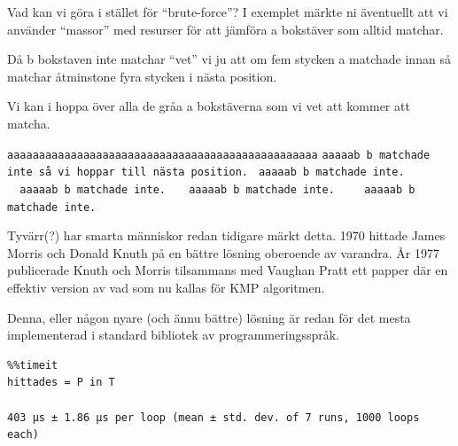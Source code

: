 \documentclass[11pt, aspectratio=169, table]{beamer}
\begin{document}
\begin{frame}{Vad kan vi göra i stället för ``brute-force''?}
\vspace{-0.5cm}
I exemplet märkte ni äventuellt att vi använder ``massor'' med resurser för att jämföra a bokstäver som alltid matchar.

Då b bokstaven inte matchar ``vet'' vi ju att om fem stycken a matchade innan så matchar åtminstone fyra stycken i nästa position.

Vi kan i hoppa över alla de gråa a bokstäverna som vi vet att kommer att matcha.

\texttt{aaaaaaaaaaaaaaaaaaaaaaaaaaaaaaaaaaaaaaaaaaaaaaaaa}\linebreak
{\color{green}\texttt{aaaaa}}{\color{red}\texttt{b}}{\color{gray}\texttt{~b matchade inte så vi hoppar till nästa position.}}\linebreak
{\color{gray}\texttt{~aaaa}}{\color{green}\texttt{a}}{\color{red}\texttt{b}}{\color{gray}\texttt{~b matchade inte.}}\linebreak
{\color{gray}\texttt{~~aaaa}}{\color{green}\texttt{a}}{\color{red}\texttt{b}}{\color{gray}\texttt{~b matchade inte.}}\linebreak
{\color{gray}\texttt{~~~aaaa}}{\color{green}\texttt{a}}{\color{red}\texttt{b}}{\color{gray}\texttt{~b matchade inte.}}\linebreak
{\color{gray}\texttt{~~~~aaaa}}{\color{green}\texttt{a}}{\color{red}\texttt{b}}{\color{gray}\texttt{~b matchade inte.}}\linebreak
\end{frame}

\begin{frame}[fragile]{Tyvärr(?) har smarta människor redan tidigare märkt detta.}
\setlength{\parskip}{\fill}
1970 hittade James Morris och Donald Knuth på en bättre lösning oberoende av varandra. År 1977 publicerade Knuth och Morris 
tilsammans med Vaughan Pratt ett papper där en effektiv version av vad som nu kallas för \alert{KMP algoritmen}.

Denna, eller någon nyare (och ännu bättre) lösning är redan för det mesta implementerad i standard bibliotek av programmeringsspråk. 

\begin{verbatim}
%%timeit
hittades = P in T

403 µs ± 1.86 µs per loop (mean ± std. dev. of 7 runs, 1000 loops each)
\end{verbatim}
\end{frame}
\end{document}
